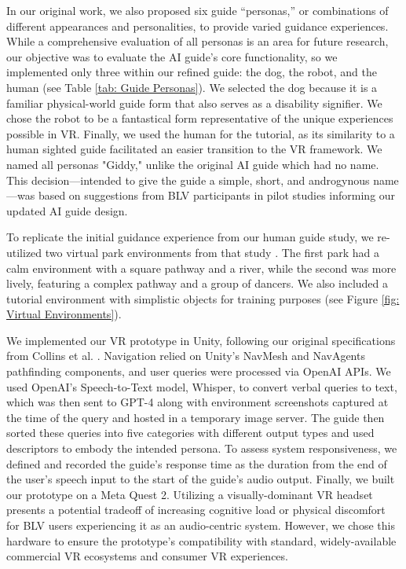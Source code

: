 In our original work, we also proposed six guide “personas,” or combinations of different appearances and personalities, to provide varied guidance experiences. While a comprehensive evaluation of all personas is an area for future research, our objective was to evaluate the AI guide's core functionality, so we implemented only three within our refined guide: the dog, the robot, and the human (see Table \ref{tab: Guide Personas}). We selected the dog because it is a familiar physical-world guide form that also serves as a disability signifier. We chose the robot to be a fantastical form representative of the unique experiences possible in VR. Finally, we used the human for the tutorial, as its similarity to a human sighted guide facilitated an easier transition to the VR framework. We named all personas "Giddy," unlike the original AI guide which had no name. This decision—intended to give the guide a simple, short, and androgynous name—was based on suggestions from BLV participants in pilot studies informing our updated AI guide design.

To replicate the initial guidance experience from our human guide study, we re-utilized two virtual park environments from that study \cite{collins2023guide}. The first park had a calm environment with a square pathway and a river, while the second was more lively, featuring a complex pathway and a group of dancers. We also included a tutorial environment with simplistic objects for training purposes (see Figure \ref{fig: Virtual Environments}).

We implemented our VR prototype in Unity, following our original specifications from Collins et al. \cite{collins2024ai}. Navigation relied on Unity's NavMesh and NavAgents pathfinding components, and user queries were processed via OpenAI APIs. We used OpenAI's Speech-to-Text model, Whisper, to convert verbal queries to text, which was then sent to GPT-4 along with environment screenshots captured at the time of the query and hosted in a temporary image server. The guide then sorted these queries into five categories with different output types and used descriptors to embody the intended persona. To assess system responsiveness, we defined and recorded the guide's response time as the duration from the end of the user's speech input to the start of the guide's audio output. Finally, we built our prototype on a Meta Quest 2. Utilizing a visually-dominant VR headset presents a potential tradeoff of increasing cognitive load or physical discomfort for BLV users experiencing it as an audio-centric system. However, we chose this hardware to ensure the prototype's compatibility with standard, widely-available commercial VR ecosystems and consumer VR experiences.

